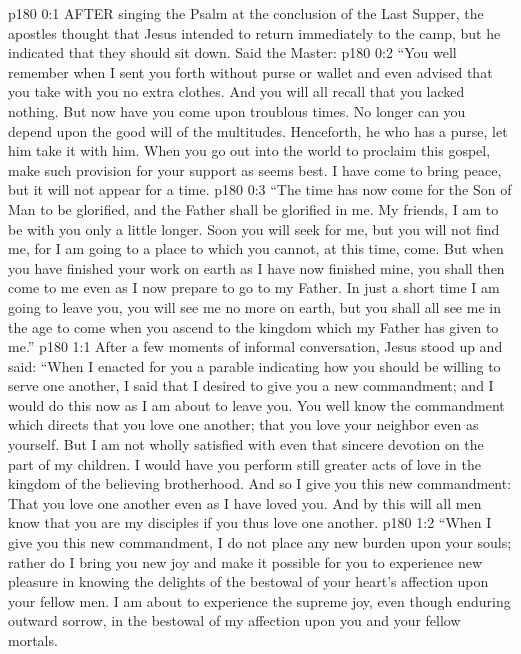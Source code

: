 \vs p180 0:1 AFTER singing the Psalm at the conclusion of the Last Supper, the apostles thought that Jesus intended to return immediately to the camp, but he indicated that they should sit down. Said the Master:
\vs p180 0:2 \textcolor{ubdarkred}{“You well remember when I sent you forth without purse or wallet and even advised that you take with you no extra clothes. And you will all recall that you lacked nothing. But now have you come upon troublous times. No longer can you depend upon the good will of the multitudes. Henceforth, he who has a purse, let him take it with him. When you go out into the world to proclaim this gospel, make such provision for your support as seems best. I have come to bring peace, but it will not appear for a time.}
\vs p180 0:3 \textcolor{ubdarkred}{“The time has now come for the Son of Man to be glorified, and the Father shall be glorified in me. My friends, I am to be with you only a little longer. Soon you will seek for me, but you will not find me, for I am going to a place to which you cannot, at this time, come. But when you have finished your work on earth as I have now finished mine, you shall then come to me even as I now prepare to go to my Father. In just a short time I am going to leave you, you will see me no more on earth, but you shall all see me in the age to come when you ascend to the kingdom which my Father has given to me.”}
\vs p180 1:1 After a few moments of informal conversation, Jesus stood up and said: \textcolor{ubdarkred}{“When I enacted for you a parable indicating how you should be willing to serve one another, I said that I desired to give you a new commandment; and I would do this now as I am about to leave you. You well know the commandment which directs that you love one another; that you love your neighbor even as yourself. But I am not wholly satisfied with even that sincere devotion on the part of my children. I would have you perform still greater acts of love in the kingdom of the believing brotherhood. And so I give you this new commandment: That you love one another even as I have loved you. And by this will all men know that you are my disciples if you thus love one another.}
\vs p180 1:2 \textcolor{ubdarkred}{“When I give you this new commandment, I do not place any new burden upon your souls; rather do I bring you new joy and make it possible for you to experience new pleasure in knowing the delights of the bestowal of your heart’s affection upon your fellow men. I am about to experience the supreme joy, even though enduring outward sorrow, in the bestowal of my affection upon you and your fellow mortals.}
